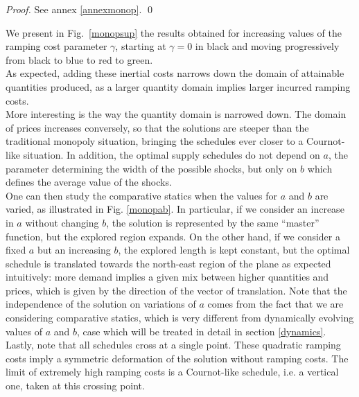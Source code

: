 \begin{proof}
See annex \ref{annexmonop}. \qed
\end{proof} 

We present in Fig.~\ref{monopsup} the results obtained for increasing values of the ramping cost parameter $\gamma$, starting at $\gamma=0$ in black and moving progressively from black to blue to red to green. \\

As expected, adding these inertial costs narrows down the domain of attainable quantities produced, as a larger quantity domain implies larger incurred ramping costs.\\

More interesting is the way the quantity domain is narrowed down. The domain of prices increases conversely, so that the solutions are steeper than the traditional monopoly situation, bringing the schedules ever closer to a Cournot-like situation. In addition, the optimal supply schedules do not depend on $a$, the parameter determining the width of the possible shocks, but only on $b$ which defines the average value of the shocks. \\

One can then study the comparative statics when the values for $a$ and $b$ are varied, as illustrated in Fig. \ref{monopab}. In particular, if we consider an increase in $a$ without changing $b$, the solution is represented by the same ``master'' function, but the explored region expands. On the other hand, if we consider a fixed $a$ but an increasing $b$, the explored length is kept constant, but the optimal schedule is translated towards the north-east region of the plane as expected intuitively: more demand implies a given mix between higher quantities and prices, which is given by the direction of the vector of translation. Note that the independence of the solution on variations of $a$ comes from the fact that we are considering comparative statics, which is very different from dynamically evolving values of $a$ and $b$, case which will be treated in detail in section \ref{dynamics}.  \\

Lastly, note that all schedules cross at a single point. These quadratic ramping costs imply a symmetric deformation of the solution without ramping costs. The limit of extremely high ramping costs is a Cournot-like schedule, i.e. a vertical one, taken at this crossing point. 

